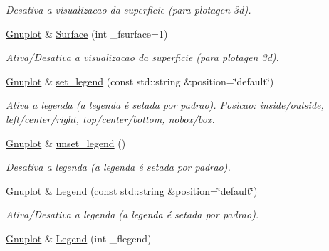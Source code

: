 \begin{DoxyCompactItemize}
\begin{DoxyCompactList}\small\item\em Desativa a visualizacao da superficie (para plotagen 3d). \end{DoxyCompactList}\item 
\hypertarget{classGnuplot_a7b338ff4ec6c49659cd2022b68c0e861}{\hyperlink{classGnuplot}{Gnuplot} \& \hyperlink{classGnuplot_a7b338ff4ec6c49659cd2022b68c0e861}{Surface} (int \-\_\-fsurface=1)}\label{classGnuplot_a7b338ff4ec6c49659cd2022b68c0e861}

\begin{DoxyCompactList}\small\item\em Ativa/\-Desativa a visualizacao da superficie (para plotagen 3d). \end{DoxyCompactList}\item 
\hypertarget{classGnuplot_ad64a717dac18167f656c4f09239973f8}{\hyperlink{classGnuplot}{Gnuplot} \& \hyperlink{classGnuplot_ad64a717dac18167f656c4f09239973f8}{set\-\_\-legend} (const std\-::string \&position=\char`\"{}default\char`\"{})}\label{classGnuplot_ad64a717dac18167f656c4f09239973f8}

\begin{DoxyCompactList}\small\item\em Ativa a legenda (a legenda é setada por padrao). Posicao\-: inside/outside, left/center/right, top/center/bottom, nobox/box. \end{DoxyCompactList}\item 
\hypertarget{classGnuplot_a584e0710d7f5bcaa35653d1987f1563e}{\hyperlink{classGnuplot}{Gnuplot} \& \hyperlink{classGnuplot_a584e0710d7f5bcaa35653d1987f1563e}{unset\-\_\-legend} ()}\label{classGnuplot_a584e0710d7f5bcaa35653d1987f1563e}

\begin{DoxyCompactList}\small\item\em Desativa a legenda (a legenda é setada por padrao). \end{DoxyCompactList}\item 
\hypertarget{classGnuplot_aec3037a558d26535e3847c52d1b120aa}{\hyperlink{classGnuplot}{Gnuplot} \& \hyperlink{classGnuplot_aec3037a558d26535e3847c52d1b120aa}{Legend} (const std\-::string \&position=\char`\"{}default\char`\"{})}\label{classGnuplot_aec3037a558d26535e3847c52d1b120aa}

\begin{DoxyCompactList}\small\item\em Ativa/\-Desativa a legenda (a legenda é setada por padrao). \end{DoxyCompactList}\item 
\hypertarget{classGnuplot_a781ffec9b2ddd9706823b865acb95d0b}{\hyperlink{classGnuplot}{Gnuplot} \& \hyperlink{classGnuplot_a781ffec9b2ddd9706823b865acb95d0b}{Legend} (int \-\_\-flegend)}\label{classGnuplot_a781ffec9b2ddd9706823b865acb95d0b}


\end{DoxyCompactItemize}

